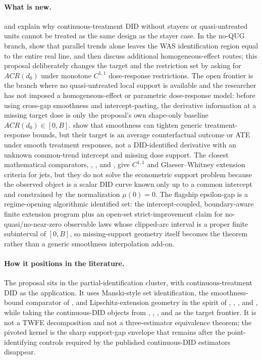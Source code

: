 \documentclass[11pt]{article}
\theoremstyle{definition}
\theoremstyle{plain}
\theoremstyle{remark}
\begin{document}
\paragraph{What is new.}
\citet{DCDHVB2024NoStayers} and \citet{DCDHK2026NoUntreated} explain why continuous-treatment DID without stayers or quasi-untreated units cannot be treated as the same design as the stayer case.  In the no-QUG branch, \citet{DCDHK2026NoUntreated} show that parallel trends alone leaves the WAS identification region equal to the entire real line, and then discuss additional homogeneous-effect routes; this proposal deliberately changes the target and the restriction set by asking for \(ACR(d_0)\) under monotone \(C^{1,1}\) dose-response restrictions.  The open frontier is the branch where no quasi-untreated local support is available and the researcher has not imposed a homogeneous-effect or parametric dose-response model: before using cross-gap smoothness and intercept-pasting, the derivative information at a missing target dose is only the proposal's own shape-only baseline \(ACR(d_0)\in[0,B]\).  \citet{KimKwonKwonLee2018} show that smoothness can tighten generic treatment-response bounds, but their target is an average counterfactual outcome or ATE under smooth treatment responses, not a DID-identified derivative with an unknown common-trend intercept and missing dose support.  The closest mathematical comparators, \citet{Wells1973}, \citet{LeGruyer2009}, and \citet{DaniilidisHaddouLeGruyerLey2018}, give \(C^{1,1}\) and Glaeser--Whitney extension criteria for jets, but they do not solve the econometric support problem because the observed object is a scalar DID curve known only up to a common intercept and constrained by the normalization \(\mu(0)=0\).  The flagship epsilon-gap is a regime-opening algorithmic identified set: the intercept-coupled, boundary-aware finite extension program plus an open-set strict-improvement claim for no-quasi/no-near-zero observable laws whose clipped-arc interval is a proper finite subinterval of \([0,B]\), so missing-support geometry itself becomes the theorem rather than a generic smoothness interpolation add-on.

\paragraph{How it positions in the literature.}
The proposal sits in the partial-identification cluster, with continuous-treatment DID as the application.  It uses Manski-style set identification, the smoothness-bound comparator of \citet{KimKwonKwonLee2018}, and Lipschitz-extension geometry in the spirit of \citet{Whitney1934}, \citet{Wells1973}, \citet{LeGruyer2009}, and \citet{DaniilidisHaddouLeGruyerLey2018}, while taking the continuous-DID objects from \citet{DHaultfoeuilleHoderleinSasaki2023}, \citet{DCDHPSVB2025ContinuousEveryPeriod}, \citet{DCDHVB2024NoStayers}, and \citet{DCDHK2026NoUntreated} as the target frontier.  It is not a TWFE decomposition and not a three-estimator equivalence theorem; the pivoted kernel is the sharp support-gap envelope that remains after the point-identifying controls required by the published continuous-DID estimators disappear.
\end{document}
